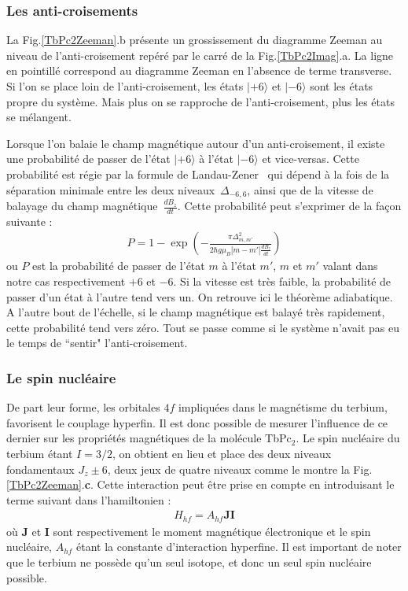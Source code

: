 \subsubsection{Les anti-croisements}
La Fig.\ref{TbPc2Zeeman}.b présente un grossissement du diagramme Zeeman au niveau de l'anti-croisement repéré par le carré de la Fig.\ref{TbPc2Imag}.a. La ligne en pointillé correspond au diagramme Zeeman en l'absence de terme transverse. Si l'on se place loin de l'anti-croisement, les états $|+6\rangle$ et $|-6\rangle$ sont les états propre du système. Mais plus on se rapproche de l'anti-croisement, plus les états se mélangent.

Lorsque l'on balaie le champ magnétique autour d'un anti-croisement, il existe une probabilité de passer de l'état $|+6\rangle$ à l'état $|-6\rangle$ et vice-versas. Cette probabilité est régie par la formule de Landau-Zener~\cite{Zener1932} qui dépend à la fois de la séparation minimale entre les deux niveaux~$\Delta_{-6,6}$, ainsi que de la vitesse de balayage du champ magnétique~$\frac{dB_z}{dt}$. Cette probabilité peut s'exprimer de la façon suivante :
\begin{eqnarray}
P = 1 - \exp \left( -\frac{\pi \Delta^2_{m,m'}}{2 \hbar g \mu_B |m-m'|\frac{dB_z}{dt}} \right)
\end{eqnarray}
ou $P$ est la probabilité de passer de l'état $m$ à l'état $m'$, $m$ et $m'$ valant dans notre cas respectivement $+6$ et $-6$. Si la vitesse est très faible, la probabilité de passer d'un état à l'autre tend vers un. On retrouve ici le théorème adiabatique. A l'autre bout de l'échelle, si le champ magnétique est balayé très rapidement, cette probabilité tend vers zéro. Tout se passe comme si le système n'avait pas eu le temps de ``sentir" l'anti-croisement.




\subsubsection{Le spin nucléaire}
De part leur forme, les orbitales $4f$ impliquées dans le magnétisme du terbium, favorisent le couplage hyperfin. Il est donc possible de mesurer l'influence de ce dernier sur les propriétés magnétiques de la molécule TbPc$_{2}$. Le spin nucléaire du terbium étant $I = 3/2$, on obtient en lieu et place des deux niveaux fondamentaux $J_z \pm 6$, deux jeux de quatre niveaux comme le montre la Fig.\ref{TbPc2Zeeman}.\textbf{c}. Cette interaction peut être prise en compte en introduisant le terme suivant dans l'hamiltonien :
\begin{eqnarray}
H_{hf} = A_{hf}\mathbf{J}\mathbf{I}
\end{eqnarray}
où $\mathbf{J}$ et $\mathbf{I}$ sont respectivement le moment magnétique électronique et le spin nucléaire, $A_{hf}$ étant la constante d'interaction hyperfine. Il est important de noter que le terbium ne possède qu'un seul isotope, et donc un seul spin nucléaire possible.

